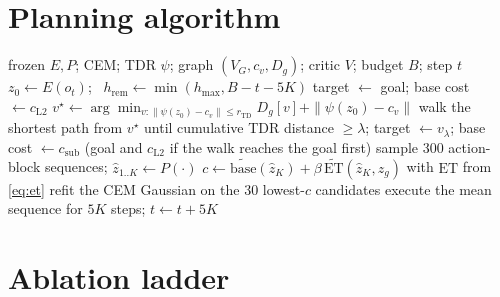 \documentclass{article} %
\newcommand{\z}{z}
\newcommand{\psiT}{\psi}
\newcommand{\Htd}{r_{\mathrm{TD}}}
\newcommand{\ET}{\mathrm{ET}}
\theoremstyle{definition}
\theoremstyle{remark}
\begin{document}



\clearpage
\appendix
{}
\section{Planning algorithm}
\label{app:algorithm}
\begin{algorithm}[h]
\caption{One planning call of graph-assisted latent MPC}
\label{alg:main}
\begin{algorithmic}[1]
\REQUIRE frozen $E,P$; CEM; TDR $\psiT$; graph $(V_G,c_v,D_g)$; critic $V$; budget $B$; step $t$
\STATE $\z_0\gets E(o_t)$; \ $h_{\mathrm{rem}}\gets\min(h_{\max},B-t-5K)$
\IF{$\|\psiT(\z_0)-\psiT(\z_g)\|\le\lambda$} \STATE target $\gets$ goal; base cost $\gets c_{\mathrm{L2}}$
\ELSE \STATE $v^\star\gets\arg\min_{v:\|\psiT(\z_0)-c_v\|\le\Htd} D_g[v]+\|\psiT(\z_0)-c_v\|$
\STATE walk the shortest path from $v^\star$ until cumulative TDR distance $\ge\lambda$; target $\gets v_\lambda$; base cost $\gets c_{\mathrm{sub}}$ (goal and $c_{\mathrm{L2}}$ if the walk reaches the goal first)
\ENDIF
{}
  \STATE sample 300 action-block sequences; $\hat\z_{1..K}\gets P(\cdot)$
  \STATE $c\gets\widetilde{\text{base}}(\hat\z_K)+\beta\,\widetilde{\ET}(\hat\z_K,\z_g)$ with $\ET$ from \cref{eq:et}
  \STATE refit the CEM Gaussian on the 30 lowest-$c$ candidates
\ENDFOR
\STATE execute the mean sequence for $5K$ steps; $t\gets t+5K$
\end{algorithmic}
\end{algorithm}

\section{Ablation ladder}
\label{app:ablation}
\end{document}
